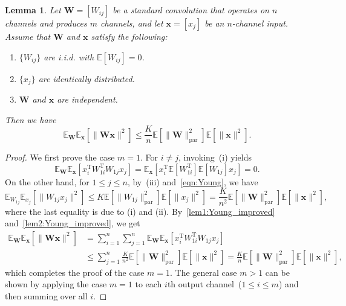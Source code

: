 \documentclass[10pt,a4paper]{amsart}
\numberwithin{equation}{section}
\newtheorem{lemma}[lemma]{Lemma}
\theoremstyle{remark}
\newcommand\bW{\mathbf{W}}
\newcommand\bx{\mathbf{x}}
\newcommand\rT{\mathrm{T}}
\newcommand\bbE{\mathbb{E}}
\newcommand\param{\mathrm{par}}
\begin{document}
\begin{lemma}
    \label{lem:Young_improved}
    Let $\bW = [W_{ij}]$ be a standard convolution that operates on $n$ channels and produces $m$ channels, and let $\bx = [x_j]$ be an $n$-channel input.
    Assume that $\bW$ and $\bx$ satisfy the following:
    \begin{enumerate}[label=\emph{(\roman*)}]
        \item $\{ W_{ij} \}$ are i.i.d. with $\bbE [W_{ij}] = 0$.
        \item $\{ x_j \}$ are identically distributed.
        \item $\bW$ and $\bx$ are independent.
    \end{enumerate}
    Then we have
    \begin{equation*}
        \bbE_{\bW} \bbE_{\bx} \left[ \| \bW \bx \|^2 \right]
        \leq \frac{K}{n} \bbE \left[ \| \bW \|_{\param}^2 \right] \bbE \left[ \| \bx \|^2 \right].
    \end{equation*}
\end{lemma}
\begin{proof}
We first prove the case $m = 1$.
For $i \neq j$, invoking~(i) yields
\begin{equation}
    \label{lem1:Young_improved}
    \bbE_{\bW} \bbE_{\bx} \left[ x_i^{\rT} W_{1i}^{\rT} W_{1j} x_j \right]
    = \bbE_{\bx} \left[ x_i^\rT  \bbE \left[ W_{1i}^{\rT}\right] \bbE \left[ W_{1j} \right] x_j \right] = 0.
\end{equation}
On the other hand, for $1 \leq j \leq n$, by~(iii) and~\eqref{eqn:Young}, we have
\begin{equation}
    \label{lem2:Young_improved}
    \bbE_{W_{1j}} \bbE_{x_j} \left[ \| W_{1j} x_j \|^2 \right]
    \leq K \bbE \left[ \| W_{1j} \|_{\param}^2 \right] \bbE \left[ \|x_j\|^2 \right]
    = \frac{K}{n^2} \bbE \left[ \| \bW \|_{\param}^2 \right] \bbE \left[ \| \bx \|^2 \right],
\end{equation}
where the last equality is due to (i) and (ii).
By~\eqref{lem1:Young_improved} and~\eqref{lem2:Young_improved}, we get
\begin{align*}
    \bbE_{\bW} \bbE_{\bx} \left[ \| \bW \bx \|^2 \right]
    &= \sum_{i=1}^n \sum_{j=1}^n \bbE_{\bW} \bbE_{\bx} \left[ x_i^{\rT} W_{1i}^{\rT} W_{1j} x_j \right] \\
    &\leq \sum_{j=1}^n \frac{K}{n^2} \bbE \left[ \| \bW \|_{\param}^2 \right] \bbE \left[ \| \bx \|^2 \right]
    = \frac{K}{n} \bbE \left[ \| \bW \|_{\param}^2 \right] \bbE \left[ \| \bx \|^2 \right],
\end{align*}
which completes the proof of the case $m = 1$.
The general case $m > 1$ can be shown by applying the case $m = 1$ to each $i$th output channel~($1 \leq i \leq m$) and then summing over all $i$.
\end{proof}
\end{document}
